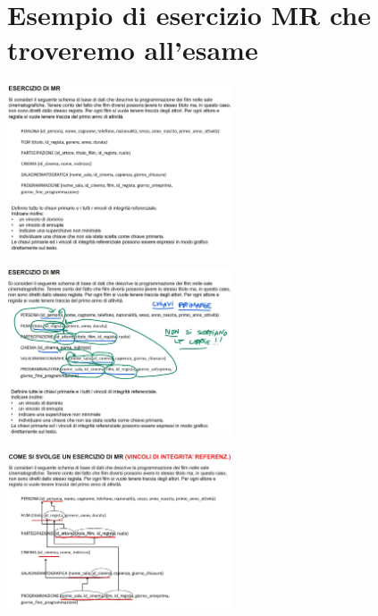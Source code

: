 \section{Esempio di esercizio MR che troveremo all'esame}
\begin{center}
    \includegraphics[width=0.5\textwidth]{img/MR_facsimile_esame1.jpg}
\end{center}
\begin{center}
    \includegraphics[width=0.5\textwidth]{img/MR_facsimile_esame2.jpg}
\end{center}
\begin{center}
    \includegraphics[width=0.5\textwidth]{img/MR_facsimile_esame3.jpg}
\end{center}


